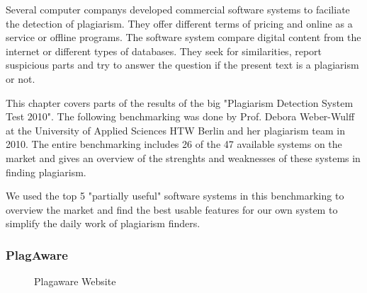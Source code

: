 Several computer companys developed commercial software systems to faciliate the detection of plagiarism. They offer different terms of pricing and online as a service or offline programs. 
The software system compare digital content from the internet or different types of databases. 
They seek for similarities, report suspicious parts and try to answer the question if the present text is a plagiarism or not.

This chapter covers parts of the results of the big "Plagiarism Detection System Test 2010". 
The following benchmarking was done by Prof. Debora Weber-Wulff at the University of Applied Sciences HTW Berlin and her plagiarism team in 2010. 
The entire benchmarking includes 26 of the 47 available systems on the market and gives an overview of the strenghts and weaknesses of these systems in finding plagiarism.

We used the top 5 "partially useful" software systems in this  benchmarking to overview the market and find the best usable features for our own system to simplify the daily work of plagiarism finders. 
\newpage
\subsubsection{PlagAware} 
 \begin{figure}[!h]
  \centering
  \caption{Plagaware Website}
  \label{fig:plagawareWebsite}
\end{figure}


